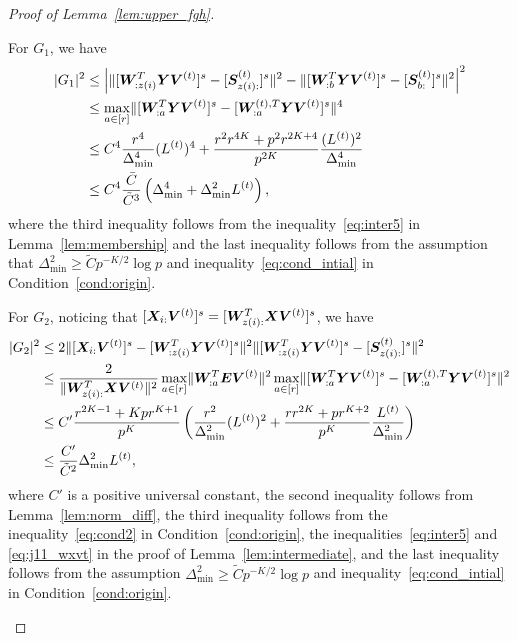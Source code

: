 \documentclass[lettersize,onecolumn,journal]{IEEEtran}
\theoremstyle{definition}
\theoremstyle{definition}
\newcommand{\of}[1]{\left(#1\right)}
\newcommand{\aabs}[1]{\left|#1\right|}
\begin{document}
\begin{proof}[Proof of Lemma~\ref{lem:upper_fgh}]
\begin{enumerate}[wide]
    For $G_1$, we have 
    \begin{align}
        |G_1|^2 &\leq \aabs{ \onormSize{}{ [ \mW_{:z(i)}^T \mY \mV^{(t)} ]^s - [ \mS_{z(i):}^{(t)}  ]^s}^2 - \onormSize{}{ [ \mW_{:b}^T \mY \mV^{(t)} ]^s -  [ \mS_{b:}^{(t)}  ]^s }^2 }^2 \\
        & \leq \max_{a \in [r]} \onormSize{}{ [ \mW_{:a}^T \mY \mV^{(t)} ]^s - [ \mW_{:a}^{(t),T} \mY \mV^{(t)}  ]^s}^4\\
        & \leq C^4 \frac{r^4}{\Delta_{\min}^4} (L^{(t)})^4 +  \frac{r^2 r^{4K} + p^2r^{2K+4}}{p^{2K}} \frac{(L^{(t)})^2}{\Delta_{\min}^4} \\
        & \leq C^4 \frac{\bar C}{\tilde C^3} \of{\Delta_{\min}^4 +  \Delta_{\min}^2 L^{(t)}}, \label{eq:g1}
    \end{align}
    where the third inequality follows from the inequality~\eqref{eq:inter5} in Lemma~\ref{lem:membership} and the last inequality follows from the assumption that $\Delta_{\min}^2 \geq \tilde C p^{-K/2}\log p$ and inequality~\eqref{eq:cond_intial} in Condition~\ref{cond:origin}.
    
    For $G_2$, noticing that $[\bm X_{i:} \bm{V}^{(t)}]^s = [ \bm{W}_{z(i):}^T\bm X \bm{V}^{(t)}]^s$, we have 
    \begin{align}
        |G_2|^2 &\leq 2\onormSize{}{ [\mX_{i:} \mV^{(t)}]^s  -  [  \mW_{:z(i)}^T \mY \mV^{(t)} ]^s}^2 \onormSize{}{ [  \mW_{:z(i)}^T \mY \mV^{(t)} ]^s -  [  \mS_{z(i):}^{(t)}  ]^s }^2 \\
        & \leq \frac{2}{ \onormSize{}{ \mW_{z(i):}^T\mX \mV^{(t)}}^2} \max_{a \in [r]}\onormSize{}{ \mW_{:a}^T \mE \mV^{(t)} }^2 \max_{a \in [r]} \onormSize{}{ [  \mW_{:a}^T \mY \mV^{(t)} ]^s -  [   \mW_{:a}^{(t),T} \mY \mV^{(t)}  ]^s}^2\\
        & \leq C' \frac{ r^{2K-1} + K p r^{K+1} }{p^{K}} \of{ \frac{r^2}{\Delta_{\min}^2} (L^{(t)})^2 + \frac{r r^{2K} + pr^{K+2}}{p^{K}} \frac{L^{(t)}}{\Delta_{\min}^2} }\\
        & \leq \frac{C'}{\tilde C^2} \Delta_{\min}^2 L^{(t)},\label{eq:g2}
    \end{align}
    where $C'$ is a positive universal constant, the second inequality follows from Lemma~\ref{lem:norm_diff}, the third inequality follows from the inequality~\eqref{eq:cond2} in Condition~\ref{cond:origin}, the inequalities~\eqref{eq:inter5} and \eqref{eq:j11_wxvt} in the proof of Lemma~\ref{lem:intermediate},  and the last inequality follows from the assumption $\Delta_{\min}^2 \geq \tilde C p^{-K/2} \log p$ and inequality~\eqref{eq:cond_intial} in Condition~\ref{cond:origin}.
    

\end{enumerate}
\end{proof}
\end{document}
